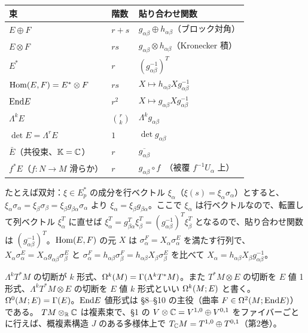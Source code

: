 \begin{center}
\begin{tabular}{lll}
\toprule
束 & 階数 & 貼り合わせ関数\\
\midrule
$E\oplus F$ & $r+s$ & $g_{\alpha\beta}\oplus h_{\alpha\beta}$（ブロック対角）\\
$E\otimes F$ & $rs$ & $g_{\alpha\beta}\otimes h_{\alpha\beta}$（Kronecker 積）\\
$E^*$ & $r$ & $(g_{\alpha\beta}^{-1})^T$\\
$\mathrm{Hom}(E,F)=E^*\otimes F$ & $rs$ & $X\mapsto h_{\alpha\beta}Xg_{\alpha\beta}^{-1}$\\
$\mathrm{End} E$ & $r^2$ & $X\mapsto g_{\alpha\beta}Xg_{\alpha\beta}^{-1}$\\
$\Lambda^kE$ & $\binom rk$ & $\Lambda^kg_{\alpha\beta}$\\
$\det E=\Lambda^rE$ & $1$ & $\det g_{\alpha\beta}$\\
$\bar E$（共役束、$\mathbb K=\mathbb C$） & $r$ & $\overline{g_{\alpha\beta}}$\\
$f^*E$（$f:N\to M$ 滑らか） & $r$ & $g_{\alpha\beta}\circ f$\ （被覆 $f^{-1}U_\alpha$ 上）\\
\bottomrule
\end{tabular}
\end{center}
たとえば双対：$\xi\in E^*_p$ の成分を行ベクトル $\xi_\alpha$（$\xi(s)=\xi_\alpha\sigma_\alpha$）とすると、$\xi_\alpha\sigma_\alpha=\xi_\beta\sigma_\beta=\xi_\beta g_{\beta\alpha}\sigma_\alpha$ より $\xi_\alpha=\xi_\beta g_{\beta\alpha}$。ここで $\xi_\alpha$ は行ベクトルなので、転置して列ベクトル $\xi_\alpha^T$ に直せば $\xi_\alpha^T=g_{\beta\alpha}^T\xi_\beta^T=(g_{\alpha\beta}^{-1})^T\xi^T_\beta$ となるので、貼り合わせ関数は $(g_{\alpha\beta}^{-1})^T$。$\mathrm{Hom}(E,F)$ の元 $X$ は $\sigma^F_\alpha=X_\alpha\sigma^E_\alpha$ を満たす行列で、$X_\alpha\sigma^E_\alpha=X_\alpha g_{\alpha\beta}\sigma^E_\beta$ と $\sigma^F_\alpha=h_{\alpha\beta}\sigma^F_\beta=h_{\alpha\beta}X_\beta\sigma^E_\beta$ を比べて $X_\alpha=h_{\alpha\beta}X_\beta g_{\alpha\beta}^{-1}$。

\begin{ex}\label{C:ex:forms}
$\Lambda^kT^*M$ の切断が $k$ 形式、$\Omega^k(M)=\Gamma(\Lambda^kT^*M)$。また $T^*M\otimes E$ の切断を $E$ 値 1 形式、$\Lambda^kT^*M\otimes E$ の切断を $E$ 値 $k$ 形式といい $\Omega^k(M;E)$ と書く。$\Omega^0(M;E)=\Gamma(E)$。$\mathrm{End} E$ 値形式は §8–§10 の主役（曲率 $F\in\Omega^2(M;\mathrm{End} E)$）である。
$TM\otimes_\mathbb R\mathbb C$ は複素束で、§1 の $V\otimes\mathbb C=V^{1,0}\oplus V^{0,1}$ をファイバーごとに行えば、概複素構造 $J$ のある多様体上で $T_\mathbb C M=T^{1,0}\oplus T^{0,1}$（第2巻）。
\end{ex}


